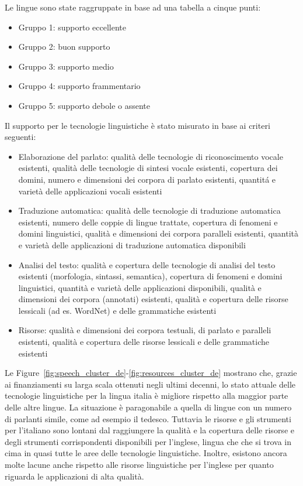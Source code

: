 \documentclass[]{../../metanetpaper}
\begin{document}
\begin{multicols}{2}
Le lingue sono state raggruppate in base ad una tabella a cinque punti:
\begin{itemize}
\item Gruppo 1: supporto eccellente
\item Gruppo 2: buon supporto
\item Gruppo 3: supporto medio
\item Gruppo 4: supporto frammentario
\item Gruppo 5: supporto debole o assente
\end{itemize}


Il supporto per le tecnologie linguistiche è stato misurato in base ai criteri seguenti:

\begin{itemize}
\item Elaborazione del parlato: qualit\`{a} delle tecnologie di riconoscimento vocale esistenti, qualit\`{a} delle tecnologie
di sintesi vocale esistenti, copertura dei domini, numero e dimensioni dei corpora di parlato esistenti, quantit\'a e variet\`{a}
 delle applicazioni vocali esistenti
\item Traduzione automatica: qualit\`{a} delle tecnologie di traduzione automatica esistenti, numero delle coppie di lingue trattate, 
copertura di fenomeni e domini linguistici, qualit\`{a} e dimensioni dei corpora paralleli esistenti, quantit\`{a} e variet\`{a} 
delle applicazioni di traduzione automatica disponibili
\item Analisi del testo: qualit\`{a} e copertura delle tecnologie di analisi del testo esistenti (morfologia, sintassi, semantica),
copertura di fenomeni e domini linguistici, quantit\`{a} e variet\`{a} delle applicazioni disponibili, qualit\`{a} e dimensioni dei
corpora (annotati) esistenti, qualit\`{a} e copertura delle risorse lessicali (ad es. WordNet) e delle grammatiche esistenti
\item Risorse: qualit\`{a} e dimensioni dei corpora testuali, di parlato e paralleli esistenti, qualit\`{a} e copertura delle risorse lessicali e 
delle grammatiche esistenti
\end{itemize} 

Le Figure~\ref{fig:speech_cluster_de}-\ref{fig:resources_cluster_de} mostrano
che, grazie ai finanziamenti su larga scala ottenuti negli ultimi decenni, lo
stato attuale delle tecnologie linguistiche per la lingua italia \`{e}
migliore rispetto alla maggior parte delle altre lingue. La situazione \`{e}
paragonabile a quella di lingue con un numero di parlanti simile, come ad
esempio il tedesco. Tuttavia le risorse e gli strumenti per l'italiano sono lontani
dal raggiungere la qualit\`{a} e la copertura delle risorse e degli 
strumenti corrispondenti disponibili per l'inglese, lingua che che si trova in cima in quasi
tutte le aree delle tecnologie linguistiche. Inoltre, esistono ancora molte
lacune anche rispetto alle risorse linguistiche per l'inglese per quanto
riguarda le applicazioni di alta qualit\`{a}.



\end{multicols}
\end{document}

